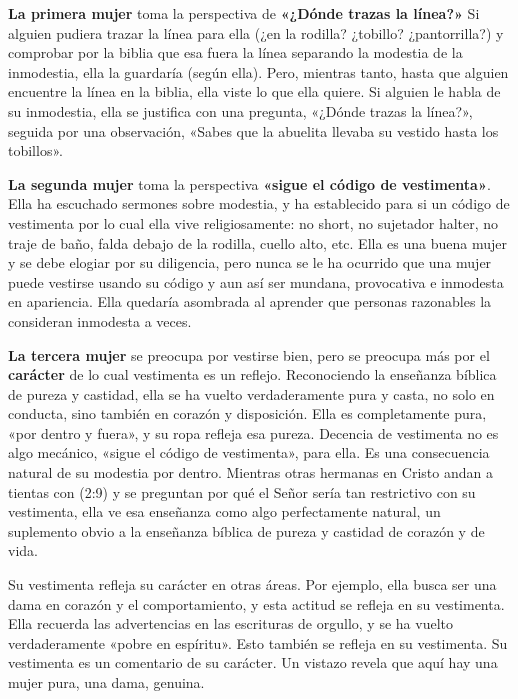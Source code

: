 \documentclass[12pt, twoside, openright]{book}
\begin{document}
\textbf{La primera mujer} toma la perspectiva de \textbf{«¿Dónde trazas la línea?»} Si alguien pudiera trazar la línea para ella (¿en la rodilla? ¿tobillo? ¿pantorrilla?) y comprobar por la biblia que esa fuera la línea separando la modestia de la inmodestia, ella la guardaría (según ella). Pero, mientras tanto, hasta que alguien encuentre la línea en la biblia, ella viste lo que ella quiere. Si alguien le habla de su inmodestia, ella se justifica con una pregunta, «¿Dónde trazas la línea?», seguida por una observación, «Sabes que la abuelita llevaba su vestido hasta los tobillos». 

\textbf{La segunda mujer} toma la perspectiva \textbf{«sigue el código de vestimenta»}. Ella ha escuchado sermones sobre modestia, y ha establecido para si un código de vestimenta por lo cual ella vive religiosamente: no short, no sujetador halter, no traje de baño, falda debajo de la rodilla, cuello alto, etc. Ella es una buena mujer y se debe elogiar por su diligencia, pero nunca se le ha ocurrido que una mujer puede vestirse usando su código y aun así ser mundana, provocativa e inmodesta en apariencia. Ella quedaría asombrada al aprender que personas razonables la consideran inmodesta a veces. 

\textbf{La tercera mujer} se preocupa por vestirse bien, pero se preocupa más por el \textbf{carácter} de lo cual vestimenta es un reflejo. Reconociendo la enseñanza bíblica de pureza y castidad, ella se ha vuelto verdaderamente pura y casta, no solo en conducta, sino también en corazón y disposición. Ella es completamente pura, «por dentro y fuera», y su ropa refleja esa pureza. Decencia de vestimenta no es algo mecánico, «sigue el código de vestimenta», para ella. Es una consecuencia natural de su modestia por dentro. Mientras otras hermanas en Cristo andan a tientas con (2:9) y se preguntan por qué el Señor sería tan restrictivo con su vestimenta, ella ve esa enseñanza como algo perfectamente natural, un suplemento obvio a la enseñanza bíblica de pureza y castidad de corazón y de vida. 

Su vestimenta refleja su carácter en otras áreas. Por ejemplo, ella busca ser una dama en corazón y el comportamiento, y esta actitud se refleja en su vestimenta. Ella recuerda las advertencias en las escrituras de orgullo, y se ha vuelto verdaderamente «pobre en espíritu». Esto también se refleja en su vestimenta. Su vestimenta es un comentario de su carácter. Un vistazo revela que aquí hay una mujer pura, una dama, genuina.
\end{document}
